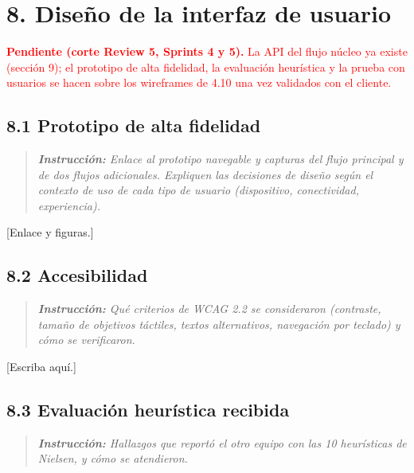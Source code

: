 \section{8. Diseño de la interfaz de
usuario}\label{diseuxf1o-de-la-interfaz-de-usuario}

\textcolor{red}{\textbf{Pendiente (corte Review 5, Sprints 4 y 5).} La API del flujo núcleo ya existe
(sección 9); el prototipo de alta fidelidad, la evaluación heurística y la prueba con usuarios se hacen
sobre los wireframes de 4.10 una vez validados con el cliente.}

\subsection{8.1 Prototipo de alta
fidelidad}\label{prototipo-de-alta-fidelidad}

\begin{quote}
\emph{\textbf{Instrucción:} Enlace al prototipo navegable y capturas del
flujo principal y de dos flujos adicionales. Expliquen las decisiones de
diseño según el contexto de uso de cada tipo de usuario (dispositivo,
conectividad, experiencia).}
\end{quote}

{[}Enlace y figuras.{]}

\subsection{8.2 Accesibilidad}\label{accesibilidad}

\begin{quote}
\emph{\textbf{Instrucción:} Qué criterios de WCAG 2.2 se consideraron
(contraste, tamaño de objetivos táctiles, textos alternativos,
navegación por teclado) y cómo se verificaron.}
\end{quote}

{[}Escriba aquí.{]}

\subsection{8.3 Evaluación heurística
recibida}\label{evaluaciuxf3n-heuruxedstica-recibida}

\begin{quote}
\emph{\textbf{Instrucción:} Hallazgos que reportó el otro equipo con las
10 heurísticas de Nielsen, y cómo se atendieron.}
\end{quote}

